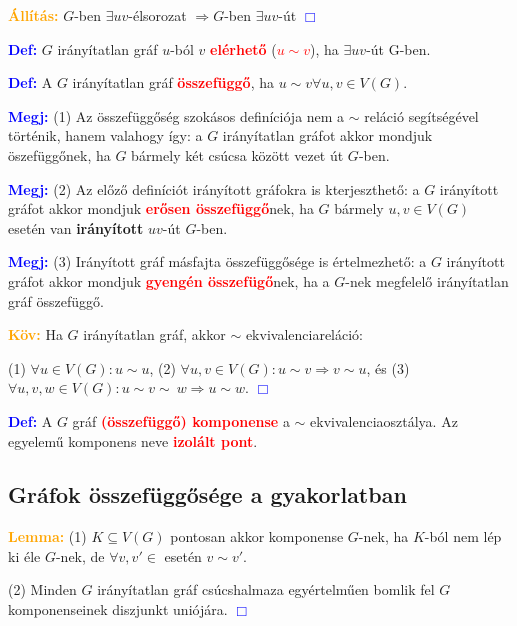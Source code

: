 \documentclass[../szamtud.tex]{subfiles}
\begin{document}
        \textcolor{orange}{\textbf{Állítás:}} $G$-ben $\exists uv$-élsorozat $\Rightarrow G$-ben $\exists uv$-út \textcolor{blue}{$\Box$}

        \textcolor{blue}{\textbf{Def:}} $G$ irányítatlan gráf $u$-ból $v$ \textcolor{red}{\textbf{elérhető}} (\textcolor{red}{\textbf{$u \sim v$}}), ha $\exists uv$-út G-ben.

        \textcolor{blue}{\textbf{Def:}} A $G$ irányítatlan gráf \textcolor{red}{\textbf{összefüggő}}, ha $u \sim v \forall u,v \in V(G)$.

        \textcolor{blue}{\textbf{Megj:}} (1) Az összefüggőség szokásos definíciója nem a $\sim$ reláció segítségével történik, hanem valahogy így: a $G$ irányítatlan gráfot akkor mondjuk öszefüggőnek, ha $G$ bármely két csúcsa között vezet út $G$-ben.

        \textcolor{blue}{\textbf{Megj:}} (2) Az előző definíciót irányított gráfokra is kterjeszthető: a $G$ irányított gráfot akkor mondjuk \textcolor{red}{\textbf{erősen összefüggő}}nek, ha $G$ bármely $u,v \in V(G) $ esetén van \textbf{irányított} $uv$-út $G$-ben.

        \textcolor{blue}{\textbf{Megj:}} (3) Irányított gráf másfajta összefüggősége is értelmezhető: a $G$ irányított gráfot akkor mondjuk \textcolor{red}{\textbf{gyengén összefügő}}nek, ha a $G$-nek megfelelő irányítatlan gráf összefüggő.

        \textcolor{orange}{\textbf{Köv:}} Ha $G$ irányítatlan gráf, akkor $\sim$ ekvivalenciareláció:

        (1) $\forall u \in V(G) : u \sim u$, (2) $ \forall u,v \in V(G) : u \sim v \Rightarrow v \sim u$, és (3) $\forall u,v,w \in V(G): u \sim v \sim \ w \Rightarrow u \sim w$. \textcolor{blue}{$\Box$}

        \textcolor{blue}{\textbf{Def:}} A $G$ gráf \textcolor{red}{\textbf{(összefüggő) komponense}} a $\sim$ ekvivalenciaosztálya. Az egyelemű komponens neve \textcolor{red}{\textbf{izolált pont}}.

    \subsection{Gráfok összefüggősége a gyakorlatban}

        \textcolor{orange}{\textbf{Lemma:}} (1) $K \subseteq V(G)$ pontosan akkor komponense $G$-nek, ha $K$-ból nem lép ki éle $G$-nek, de $\forall v,v' \in$ esetén $v \sim v'$.

        (2) Minden $G$ irányítatlan gráf csúcshalmaza egyértelműen bomlik fel $G$ komponenseinek diszjunkt uniójára. \textcolor{blue}{$\Box$}
\end{document}
